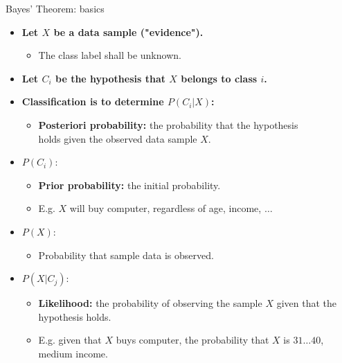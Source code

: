 \documentclass[aspectratio=169,t,table]{beamer}
\begin{document}
  {
    \begin{frame}{Bayes' Theorem: basics}
        \begin{itemize}
          \item \textbf{Let $X$ be a data sample ("evidence").}
          \begin{itemize}
            \item The class label shall be unknown.
          \end{itemize}
          \item \textbf{Let $C_i$ be the hypothesis that $X$ belongs to class $i$.}
          \item \textbf{Classification is to determine $P(C_i|X)$:}
          \begin{itemize}
            \item \textbf{\color{airforceblue}Posteriori probability:} the probability that the hypothesis \\ holds given the observed data sample $X$.
          \end{itemize}
          \item $P(C_i)$:
          \begin{itemize}
            \item \textbf{\color{airforceblue}Prior probability:} the initial probability.
            \item E.g. $X$ will buy computer, regardless of age, income, $\ldots$
          \end{itemize}
          \item $P(X)$:
          \begin{itemize}
            \item Probability that sample data is observed.
          \end{itemize}
          \item $P(X|C_j)$:
          \begin{itemize}
            \item \textbf{\color{airforceblue}Likelihood:} the probability of observing the sample $X$ given that the hypothesis holds.
            \item E.g. given that $X$ buys computer, the probability that $X$ is $31\ldots40$, medium income.
          \end{itemize}
        \end{itemize}
    \end{frame}
  }
\end{document}
